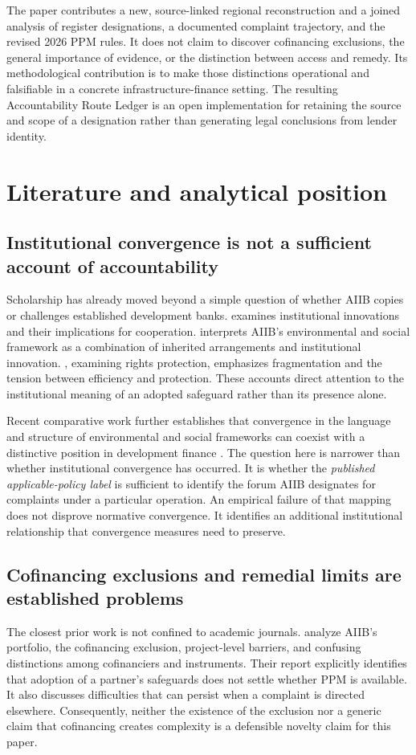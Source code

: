 \documentclass[11pt,a4paper]{article}
\begin{document}
The paper contributes a new, source-linked regional reconstruction and a joined analysis of register designations, a documented complaint trajectory, and the revised 2026 PPM rules. It does not claim to discover cofinancing exclusions, the general importance of evidence, or the distinction between access and remedy. Its methodological contribution is to make those distinctions operational and falsifiable in a concrete infrastructure-finance setting. The resulting Accountability Route Ledger is an open implementation for retaining the source and scope of a designation rather than generating legal conclusions from lender identity.

\section{Literature and analytical position}
\subsection{Institutional convergence is not a sufficient account of accountability}
Scholarship has already moved beyond a simple question of whether AIIB copies or challenges established development banks. \citet{ransdell2019} examines institutional innovations and their implications for cooperation. \citet{gu2023} interprets AIIB's environmental and social framework as a combination of inherited arrangements and institutional innovation. \citet{creutz2023}, examining rights protection, emphasizes fragmentation and the tension between efficiency and protection. These accounts direct attention to the institutional meaning of an adopted safeguard rather than its presence alone.

Recent comparative work further establishes that convergence in the language and structure of environmental and social frameworks can coexist with a distinctive position in development finance \citep{lee2025}. The question here is narrower than whether institutional convergence has occurred. It is whether the \emph{published applicable-policy label} is sufficient to identify the forum AIIB designates for complaints under a particular operation. An empirical failure of that mapping does not disprove normative convergence. It identifies an additional institutional relationship that convergence measures need to preserve.

\subsection{Cofinancing exclusions and remedial limits are established problems}
The closest prior work is not confined to academic journals. \citet{geary2023} analyze AIIB's portfolio, the cofinancing exclusion, project-level barriers, and confusing distinctions among cofinanciers and instruments. Their report explicitly identifies that adoption of a partner's safeguards does not settle whether PPM is available. It also discusses difficulties that can persist when a complaint is directed elsewhere. Consequently, neither the existence of the exclusion nor a generic claim that cofinancing creates complexity is a defensible novelty claim for this paper.
\end{document}
